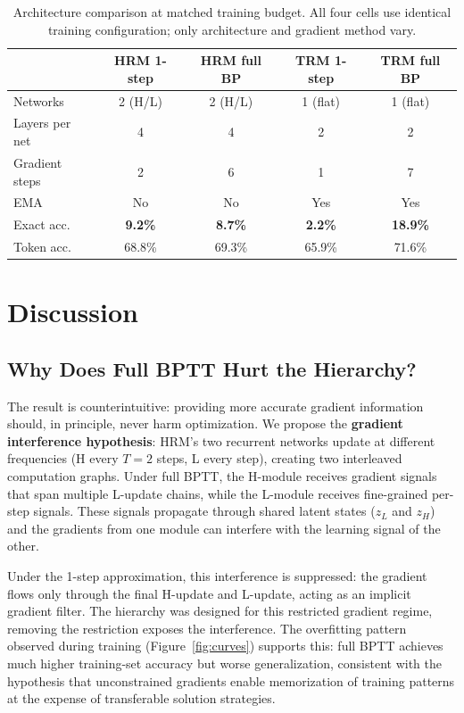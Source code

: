 \documentclass{article}
\begin{document}
\begin{table}[t]
\centering
\caption{Architecture comparison at matched training budget. All four cells use identical training configuration; only architecture and gradient method vary.}
\label{tab:architecture}
\begin{tabular}{lcccc}
\toprule
& \textbf{HRM 1-step} & \textbf{HRM full BP} & \textbf{TRM 1-step} & \textbf{TRM full BP} \\
\midrule
Networks & 2 (H/L) & 2 (H/L) & 1 (flat) & 1 (flat) \\
Layers per net & 4 & 4 & 2 & 2 \\
Gradient steps & 2 & 6 & 1 & 7 \\
EMA & No & No & Yes & Yes \\
Exact acc. & \textbf{9.2\%} & \textbf{8.7\%} & \textbf{2.2\%} & \textbf{18.9\%} \\
Token acc. & 68.8\% & 69.3\% & 65.9\% & 71.6\% \\
\bottomrule
\end{tabular}
\end{table}

\section{Discussion}

\subsection{Why Does Full BPTT Hurt the Hierarchy?}

The result is counterintuitive: providing more accurate gradient information should, in principle, never harm optimization. We propose the \textbf{gradient interference hypothesis}: HRM's two recurrent networks update at different frequencies (H every $T=2$ steps, L every step), creating two interleaved computation graphs. Under full BPTT, the H-module receives gradient signals that span multiple L-update chains, while the L-module receives fine-grained per-step signals. These signals propagate through shared latent states ($z_L$ and $z_H$) and the gradients from one module can interfere with the learning signal of the other.

Under the 1-step approximation, this interference is suppressed: the gradient flows only through the final H-update and L-update, acting as an implicit gradient filter. The hierarchy was designed for this restricted gradient regime, removing the restriction exposes the interference. The overfitting pattern observed during training (Figure~\ref{fig:curves}) supports this: full BPTT achieves much higher training-set accuracy but worse generalization, consistent with the hypothesis that unconstrained gradients enable memorization of training patterns at the expense of transferable solution strategies.
\end{document}
